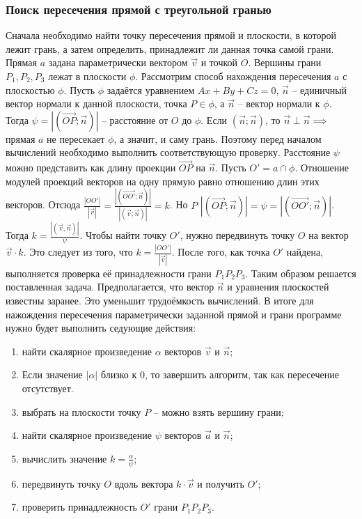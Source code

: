 {    \subsubsection{Поиcк пересечения прямой с треугольной гранью} {
        Сначала необходимо найти точку пересечения прямой и плоскости,
        в которой лежит грань, а затем определить,
        принадлежит ли данная точка самой грани.
        Прямая $a$ задана параметрически вектором $\vec{v}$ и точкой $O$.
        Вершины грани $P_1, P_2, P_3$ лежат в плоскости $\phi$.
        Рассмотрим способ нахождения пересечения $a$ с плоскостью $\phi$.
        Пусть $\phi$ задаётся уравнением $Ax + By + Cz = 0$,
        $\vec{n}$ -- единичный вектор нормали к данной плоскости,
        точка $P \in \phi$, а $\vec{n}$ -- вектор нормали к $\phi$.
        Тогда $\psi = |(\vec{OP}; \vec{n})|$ -- расстояние от $O$ до $\phi$.
        Если $(\vec{n}; \vec{n})$, то $\vec{n} \perp \vec{n} \implies$
        прямая $a$ не пересекает $\phi$, а значит, и саму грань.
        Поэтому перед началом вычислений необходимо выполнить соответствующую проверку.
        Расстояние $\psi$ можно представить как длину проекции
        $\vec{OP}$ на $\vec{n}$.
        Пусть $O' = a \cap \phi$.
        Отношение модулей проекций векторов на одну прямую равно
        отношению длин этих векторов.
        Отсюда $\frac{|OO'|}{|\vec{v}|}=
        \frac{|(\vec{OO'};\vec{n})|}{|(\vec{v};\vec{n})|} = k$.
        Но $P$ $|(\vec{OP}; \vec{n})| = \psi = |(\vec{OO'}; \vec{n})|$.
        Тогда $k = \frac{|(\vec{v}, \vec{n})|}{\psi}$.
        Чтобы найти точку $O'$, нужно передвинуть точку $O$ на вектор $\vec{v} \cdot k$.
        Это следует из того, что $k = \frac{|OO'|}{|\vec{v}|}$.
        После того, как точка $O'$ найдена, выполняется проверка
        её принадлежности грани $P_1P_2P_3$.
        Таким образом решается поставленная задача.
        \hspace{1.25cm}
        Предполагается, что вектор $\vec{n}$ и уравнения плоскостей известны заранее.
        Это уменьшит трудоёмкость вычислений.
        В итоге для нажождения пересечения параметрически заданной прямой и
        грани программе нужно будет выполнить седующие действия:
        \begin{enumerate}
            \item найти скалярное произведение $\alpha$ векторов $\vec{v}$ и $\vec{n}$;
            \item Если значение $|\alpha|$ близко к 0, то завершить алгоритм, так как пересечение отсутствует.
            \item выбрать на плоскости точку $P$ -- можно взять вершину грани;
            \item найти скалярное произведение $\psi$ векторов $\vec{a}$ и $\vec{n}$;
            \item вычислить значение $k = \frac{\alpha}{\psi}$;
            \item передвинуть точку $O$ вдоль вектора $k \cdot \vec{v}$ и получить $O'$;
            \item проверить принадлежность $O'$ грани $P_1P_2P_3$.
        \end{enumerate}
    }
}
